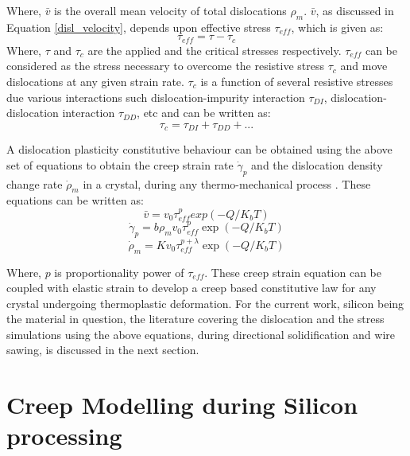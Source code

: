 Where, $\bar{v}$ is the overall mean velocity of total dislocations $\rho_{m}$. $\bar{v}$, as discussed in Equation \ref{disl_velocity}, depends upon effective stress $\tau_{eff}$, which is given as:
\begin{equation}
   \tau_{eff} = \tau - \tau_{c}  \label{tau_eff}
\end{equation}
Where, $\tau$ and $\tau_{c}$ are the applied and the critical stresses respectively. $\tau_{eff}$ can be considered as the stress necessary to overcome the resistive stress $\tau_{c}$ and move dislocations at any given strain rate. $\tau_{c}$ is a function of several resistive stresses due various interactions such dislocation-impurity interaction $\tau_{DI}$, dislocation-dislocation interaction $\tau_{DD}$, etc \cite{sumino1983interaction} and can be written as: 
\begin{equation}
   \tau_{c} = \tau_{DI} + \tau_{DD} + ...\label{tau_c}
\end{equation}

A dislocation plasticity constitutive behaviour can be obtained using the above set of equations to obtain the creep strain rate $\dot{\gamma}_{p}$ and the dislocation density change rate $\dot{\rho}_{m}$ in a crystal, during any thermo-mechanical process . These equations can be written as:
\begin{equation}
   \bar{v} = v_{0} \tau_{eff}^{p} exp(-Q/K_{b}T)  \label{mean_velocity}
\end{equation}
\begin{equation}
   \dot{\gamma}_{p} = b \rho_{m} v_{0} \tau_{eff}^{p} \exp(-Q/K_{b}T)  \label{creep_rate}
\end{equation}
\begin{equation}
   \dot{\rho}_{m} = K v_{0} \tau_{eff}^{p+\lambda} \exp(-Q/K_{b}T)  \label{creep_rate2}
\end{equation}

Where, $p$ is proportionality power of $\tau_{eff}$. These creep strain equation can be coupled with elastic strain to develop a creep based constitutive law for any crystal undergoing thermoplastic deformation. For the current work, silicon being the material in question, the literature covering the dislocation and the stress simulations using the above equations, during directional solidification and wire sawing, is discussed in the next section. 

\section{Creep Modelling during Silicon processing}

